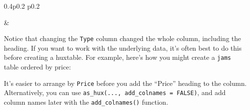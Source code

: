 \documentclass[]{article}
\newenvironment{Shaded}{\begin{snugshade}}{\end{snugshade}}
\newcommand{\CommentTok}[1]{\textcolor[rgb]{0.56,0.35,0.01}{\textit{#1}}}
\newcommand{\DataTypeTok}[1]{\textcolor[rgb]{0.13,0.29,0.53}{#1}}
\newcommand{\DecValTok}[1]{\textcolor[rgb]{0.00,0.00,0.81}{#1}}
\newcommand{\FloatTok}[1]{\textcolor[rgb]{0.00,0.00,0.81}{#1}}
\newcommand{\KeywordTok}[1]{\textcolor[rgb]{0.13,0.29,0.53}{\textbf{#1}}}
\newcommand{\NormalTok}[1]{#1}
\newcommand{\OperatorTok}[1]{\textcolor[rgb]{0.81,0.36,0.00}{\textbf{#1}}}
\newcommand{\StringTok}[1]{\textcolor[rgb]{0.31,0.60,0.02}{#1}}
\begin{document}
\begin{table}[ht]
\begin{centerbox}
\begin{threeparttable}
\begin{tabularx}{0.4\textwidth}{p{} p{}}
\hhline{}

 &
 \tabularnewline[-0.5pt]


\hhline{}
\end{tabularx}
\end{threeparttable}\par\end{centerbox}

\end{table}
 

\FloatBarrier

Notice that changing the \texttt{Type} column changed the whole column,
including the heading. If you want to work with the underlying data,
it's often best to do this before creating a huxtable. For example,
here's how you might create a \texttt{jams} table ordered by price:

\begin{Shaded}
\end{Shaded}

\FloatBarrier

It's easier to arrange by \texttt{Price} before you add the ``Price''
heading to the column. Alternatively, you can use
\texttt{as\_hux(...,\ add\_colnames\ =\ FALSE)}, and add column names
later with the \texttt{add\_colnames()} function.
\end{document}
